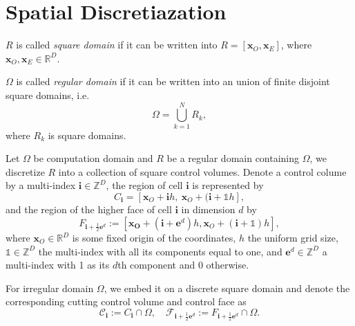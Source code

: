 \section{Spatial Discretiazation}
\label{sec:SpatialDiscretiazation}

\begin{defn}
  $R$ is called \emph{square domain} if it can be written into
  $R=[\mathbf{x}_O,\mathbf{x}_E]$, where
  $\mathbf{x}_O,\mathbf{x}_E\in\mathbb{R}^D$.
\end{defn}
\begin{defn}
  $\Omega$ is called \emph{regular domain} if it can be written into an
  union of finite disjoint square domains, i.e.
  \begin{equation}
    \Omega = \bigcup\limits_{k=1}^NR_k,
  \end{equation}
  where $R_k$ is square domains.
\end{defn}

Let $\Omega$ be computation domain and  $R$ be a regular domain
containing $\Omega$, we discretize $R$ into a
collection of square control volumes. Denote a control colume by a multi-index
$\mathbf{i}\in \mathbb{Z}^D$, the region of cell $\mathbf{i}$ is
represented by
\begin{equation}
  \label{eq:Ci}
  C_{\mathbf{i}}=\left[\mathbf{x}_O+\mathbf{i}h,\
    \mathbf{x}_O+(\mathbf{i}+\mathds{1}h\right],
\end{equation}
and the region of the higher face of cell $\mathbf{i}$ in dimension
$d$ by
\begin{equation}
  \label{eq:Fi}
  F_{\mathbf{i}+\frac{1}{2}\mathbf{e}^d}  :=
  \left[ \mathbf{\mathbf{x}_O} + \left(\mathbf{i}+\mathbf{e}^d \right)
    h, \mathbf{x}_O
    +\left(\mathbf{i}+\mathds{1}\right)h \right],
\end{equation}
where $\mathbf{x}_O\in\mathbb{R}^D$ is some fixed origin of the
coordinates, $h$ the uniform grid size, $\mathds{1}\in\mathbb{Z}^D$
the multi-index with all its components equal to one, and
$\mathbf{e}^d\in\mathbb{Z}^D$ a multi-index with 1 as its $d$th
component and 0 otherwise.

For irregular domain $\Omega$, we embed it on a discrete square
domain and  denote the corresponding cutting control volume and
control face as
\begin{equation}
  \mathcal{C}_{\mathbf{i}}:={C}_{\mathbf{i}}\cap \Omega,\quad
  \mathcal{F}_{\mathbf{i}+\frac{1}{2}\mathbf{e}^d} :=
  {F}_{\mathbf{i}+\frac{1}{2}\mathbf{e}^d}  \cap \Omega.
\end{equation}


